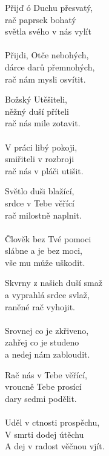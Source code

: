 {
\setlength{\columnsep}{5pt}
\begin{translatioMulticol}{5}
Přijď ó Duchu přesvatý,\\
rač paprsek bohatý\\
světla svého v nás vylít\\
\\
Přijdi, Otče nebohých,\\
dárce darů přemnohých,\\
rač nám mysli osvítit.\columnbreak

Božský Utěšiteli,\\
něžný duší příteli\\
rač nás mile zotavit.\\
\\
V práci libý pokoji,\\
smiřiteli v rozbroji\\
rač nás v pláči utišit.\columnbreak

Světlo duši blažící,\\
srdce v Tebe věřící\\
rač milostně naplnit.\\
\\
Člověk bez Tvé pomoci\\
slábne a je bez moci,\\
vše mu může uškodit.\columnbreak

Skvrny z našich duší smaž\\
a vyprahlá srdce svlaž,\\
raněné rač vyhojit.\\
\\
Srovnej co je zkřiveno,\\
zahřej co je studeno\\
a nedej nám zabloudit.\columnbreak

Rač nás v Tebe věřící,\\
vroucně Tebe prosící\\
dary sedmi podělit.\\
\\
Uděl v ctnosti prospěchu,\\
V smrti dodej útěchu\\
A dej v radost věčnou vjít.
\end{translatioMulticol}
}
